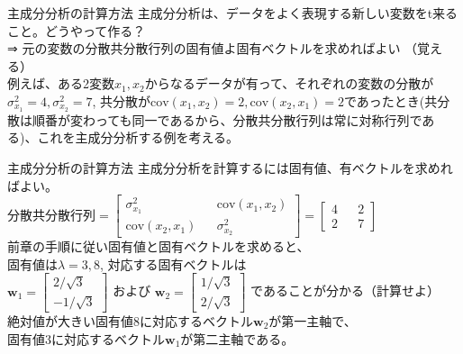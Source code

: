 \documentclass[dvipdfmx,autodetect-engine, unicode, 10pt, aspectratio=169]{beamer}
\begin{document}
\begin{frame}{主成分分析の計算方法}
    主成分分析は、データをよく表現する新しい変数をt来ること。どうやって作る？\\
    ⇒ 元の変数の分散共分散行列の固有値よ固有ベクトルを求めればよい （覚える）\\
    \vspace{10pt}
    例えば、ある2変数$x_1, x_2$からなるデータが有って、それぞれの変数の分散が$\sigma^2_{x_1}=4, \sigma^2_{x_2}=7$, 共分散が$\text{cov}(x_1, x_2)=2, \text{cov}(x_2, x_1)=2$であったとき(共分散は順番が変わっても同一であるから、分散共分散行列は常に対称行列である)、これを主成分分析する例を考える。
\end{frame}
\begin{frame}{主成分分析の計算方法}    
    主成分分析を計算するには固有値、有ベクトルを求めればよい。 \\
    $
        \text{分散共分散行列} = 
            \begin{bmatrix}
                \sigma^2_{x_1} && \text{cov}(x_1, x_2) \\
                \text{cov}(x_2, x_1) && \sigma^2_{x_2}
            \end{bmatrix} = 
            \begin{bmatrix}
                4 && 2 \\
                2 && 7
            \end{bmatrix}
    $ \\
    前章の手順に従い固有値と固有ベクトルを求めると、\\
    固有値は$\lambda = 3, 8$, 対応する固有ベクトルは\\
    $\bm{w}_1 = \begin{bmatrix}
        2/\sqrt{3} \\ -1/\sqrt{3}
    \end{bmatrix}$
    および
    $\bm{w}_2 = \begin{bmatrix}
        1/\sqrt{3} \\ 2/\sqrt{3}
    \end{bmatrix}$
    であることが分かる（計算せよ）\\
    絶対値が大きい固有値8に対応するベクトル$\bm{w}_2$が第一主軸で、\\
    固有値3に対応するベクトル$\bm{w}_1$が第二主軸である。
\end{frame}
\end{document}
